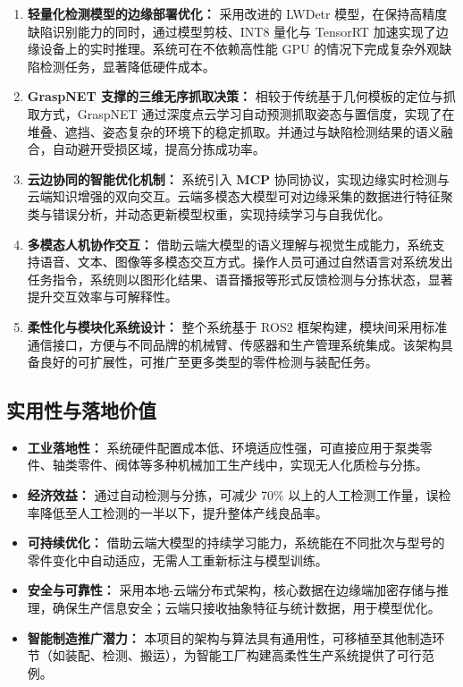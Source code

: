 \documentclass{cumcmthesis}
\begin{document}
\begin{enumerate}
    \item \textbf{轻量化检测模型的边缘部署优化：}  
    采用改进的 LWDetr 模型，在保持高精度缺陷识别能力的同时，通过模型剪枝、INT8 量化与 TensorRT 加速实现了边缘设备上的实时推理。系统可在不依赖高性能 GPU 的情况下完成复杂外观缺陷检测任务，显著降低硬件成本。

    \item \textbf{GraspNET 支撑的三维无序抓取决策：}  
    相较于传统基于几何模板的定位与抓取方式，GraspNET 通过深度点云学习自动预测抓取姿态与置信度，实现了在堆叠、遮挡、姿态复杂的环境下的稳定抓取。并通过与缺陷检测结果的语义融合，自动避开受损区域，提高分拣成功率。

    \item \textbf{云边协同的智能优化机制：}  
    系统引入 \textbf{MCP} 协同协议，实现边缘实时检测与云端知识增强的双向交互。云端多模态大模型可对边缘采集的数据进行特征聚类与错误分析，并动态更新模型权重，实现持续学习与自我优化。

    \item \textbf{多模态人机协作交互：}  
    借助云端大模型的语义理解与视觉生成能力，系统支持语音、文本、图像等多模态交互方式。操作人员可通过自然语言对系统发出任务指令，系统则以图形化结果、语音播报等形式反馈检测与分拣状态，显著提升交互效率与可解释性。

    \item \textbf{柔性化与模块化系统设计：}  
    整个系统基于 ROS2 框架构建，模块间采用标准通信接口，方便与不同品牌的机械臂、传感器和生产管理系统集成。该架构具备良好的可扩展性，可推广至更多类型的零件检测与装配任务。
\end{enumerate}

\subsection{实用性与落地价值}

\begin{itemize}
    \item \textbf{工业落地性：}  
    系统硬件配置成本低、环境适应性强，可直接应用于泵类零件、轴类零件、阀体等多种机械加工生产线中，实现无人化质检与分拣。

    \item \textbf{经济效益：}  
    通过自动检测与分拣，可减少 70\% 以上的人工检测工作量，误检率降低至人工检测的一半以下，提升整体产线良品率。

    \item \textbf{可持续优化：}  
    借助云端大模型的持续学习能力，系统能在不同批次与型号的零件变化中自动适应，无需人工重新标注与模型训练。

    \item \textbf{安全与可靠性：}  
    采用本地-云端分布式架构，核心数据在边缘端加密存储与推理，确保生产信息安全；云端只接收抽象特征与统计数据，用于模型优化。

    \item \textbf{智能制造推广潜力：}  
    本项目的架构与算法具有通用性，可移植至其他制造环节（如装配、检测、搬运），为智能工厂构建高柔性生产系统提供了可行范例。
\end{itemize}
\end{document}
